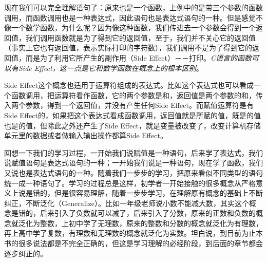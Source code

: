 \begin{BookLiteral}
\end{BookLiteral}


现在我们可以完全理解语句了：原来也是一个函数，上例中的是带三个参数的函数调用，而函数调用也是一种表达式，因此语句也是表达式语句的一种。但是感觉不像一个数学函数，为什么呢？因为像这种函数，我们传进去一个参数会得到一个返回值，我们调用函数就是为了得到它的返回值，至于，我们并不关心它的返回值（事实上它也有返回值，表示实际打印的字符数），我们调用不是为了得到它的返回值，而是为了利用它所产生的副作用（Side Effect）－－打印。\emph{C语言的函数可以有Side Effect，这一点是它和数学函数在概念上的根本区别}。



Side Effect这个概念也适用于运算符组成的表达式。比如这个表达式也可以看成一个函数调用，把运算符\BookCode{+\BookSplit{}}看作函数，它的两个参数是和，返回值是两个参数的和，传入两个参数，得到一个返回值，并没有产生任何Side Effect。而赋值运算符是有Side Effect的，如果把这个表达式看成函数调用，返回值就是所赋的值，既是的值也是的值，但除此之外还产生了Side Effect，就是变量被改变了，改变计算机存储单元里的数据或者做输入输出操作都算Side Effect。



回想一下我们的学习过程，一开始我们说赋值是一种语句，后来学了表达式，我们说赋值语句是表达式语句的一种；一开始我们说是一种语句，现在学了函数，我们又说也是表达式语句的一种。随着我们一步步的学习，把原来看似不同类型的语句统一成一种语句了。学习的过程总是这样，初学者一开始接触的很多概念从严格意义上说是错的，但是很容易理解，随着一步步学习，在理解原有概念的基础上不断纠正，不断泛化（Generalize）。比如一年级老师说小数不能减大数，其实这个概念是错的，后来引入了负数就可以减了，后来引入了分数，原来的正数和负数的概念就泛化为整数，上初中学了无理数，原来的整数和分数的概念就泛化为有理数，再上高中学了复数，有理数和无理数的概念就泛化为实数。坦白说，到目前为止本书的很多说法都是不完全正确的，但这是学习理解的必经阶段，到后面的章节都会逐步纠正的。



